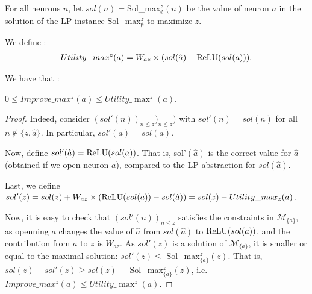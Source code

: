 \begin{definition}
	For all neurons $n$, let $sol(n)=$Sol\_max$_\emptyset^z(n)$ be the value of neuron $a$
	in the solution of the LP instance Sol\_max$_\emptyset^z$ to maximize $z$.
	
	We define : 
	\begin{align}
		Utility\_max^z(a) = W_{az} \times (sol(\hat{a})- \mathrm{ReLU}(sol(a))).
	\end{align}
	

We have that :

\begin{proposition}
$0 \leq Improve\_max^z(a) \leq Utility\_\max^z(a)$. 
\end{proposition}

\begin{proof}
Indeed, consider $(sol'(n))_{n \leq z})_{n \leq z})$ with
$sol'(n)=sol(n)$ for all $n \notin \{z,\hat{a}\}$.
In particular,  $sol'(a) = sol(a)$.

Now, define $sol'(\hat{a}) = \mathrm{ReLU}(sol(a))$. 
That is,  
sol'$(\hat{a})$ is the correct value for $\hat{a}$ (obtained if we open neuron $a$), 
compared to the LP abstraction for $sol(\hat{a})$.

Last, we define $sol'(z)=sol(z) + W_{az} \times (\mathrm{ReLU}(sol(a)) - sol(\hat{a})) = sol(z) - Utility\_max_z(a)$.

Now, it is easy to check that $(sol'(n))_{n \leq z}$ satisfies the constraints in 
$\mathcal{M}_{\{a\}}$, as openning $a$ changes the value of $\hat{a}$ from
$sol(\hat{a})$ to $\mathrm{ReLU}(sol(a))$, and the contribution from $a$ to $z$ is 
$W_{az}$. As $sol'(z)$ is a solution of $\mathcal{M}_{\{a\}}$, it is smaller or equal to the maximal solution: $sol'(z) \leq$ Sol\_max$_{\{a\}}^z(z)$. That is, 
$sol(z)-sol'(z) \geq sol(z) -$ Sol\_max$_{\{a\}}^z(z)$, i.e. 
$Improve\_max^z(a) \leq Utility\_\max^z(a)$.
\end{proof}



	
%	
	
\end{definition}

